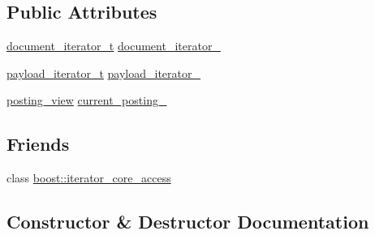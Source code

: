 \subsection*{Public Attributes}
\begin{DoxyCompactItemize}
\item 
\mbox{\hyperlink{classirk_1_1posting__list__view_abaca622760e6da2c67d55cf35207250f}{document\+\_\+iterator\+\_\+t}} \mbox{\hyperlink{classirk_1_1posting__list__view_1_1iterator_ad3355c7b169d6a36092e394e78a7eba0}{document\+\_\+iterator\+\_\+}}
\item 
\mbox{\hyperlink{classirk_1_1posting__list__view_a5a153169348a164ea2cb1a18dc76e279}{payload\+\_\+iterator\+\_\+t}} \mbox{\hyperlink{classirk_1_1posting__list__view_1_1iterator_a40e39b6fdfe8815f50f6030194b1f422}{payload\+\_\+iterator\+\_\+}}
\item 
\mbox{\hyperlink{classirk_1_1posting__list__view_1_1posting__view}{posting\+\_\+view}} \mbox{\hyperlink{classirk_1_1posting__list__view_1_1iterator_a7b1b45868eb6aa3089dcae3fd1d9eded}{current\+\_\+posting\+\_\+}}
\end{DoxyCompactItemize}
\subsection*{Friends}
\begin{DoxyCompactItemize}
\item 
class \mbox{\hyperlink{classirk_1_1posting__list__view_1_1iterator_ac09f73e325921cc50ebcd96bed0f8096}{boost\+::iterator\+\_\+core\+\_\+access}}
\end{DoxyCompactItemize}


\subsection{Constructor \& Destructor Documentation}
\mbox{\label{classirk_1_1posting__list__view_1_1iterator_a0735df34097a1113f0295d27791f985d}} 
